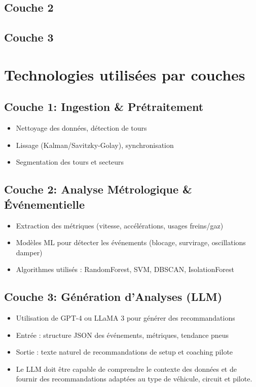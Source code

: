 \documentclass[a4paper,12pt]{report}
\begin{document}
\subsection{Couche 2}

\subsection{Couche 3}

\section{Technologies utilisées par couches}

\subsection{Couche 1: Ingestion \& Prétraitement}

\begin{itemize}
    \item Nettoyage des données, détection de tours
    \item Lissage (Kalman/Savitzky-Golay), synchronisation
    \item Segmentation des tours et secteurs
\end{itemize}

\subsection{Couche 2: Analyse Métrologique \& Événementielle}

\begin{itemize}
    \item Extraction des métriques (vitesse, accélérations, usages freins/gaz)
    \item Modèles ML pour détecter les événements (blocage, survirage, oscillations damper)
    \item Algorithmes utilisés : RandomForest, SVM, DBSCAN, IsolationForest
\end{itemize}

\subsection{Couche 3: Génération d'Analyses (LLM)}

\begin{itemize}
    \item Utilisation de GPT-4 ou LLaMA 3 pour générer des recommandations
    \item Entrée : structure JSON des événements, métriques, tendance pneus
    \item Sortie : texte naturel de recommandations de setup et coaching pilote
    \item Le LLM doit être capable de comprendre le contexte des données et de fournir des recommandations adaptées au type de véhicule, circuit et pilote.
\end{itemize}
\end{document}
